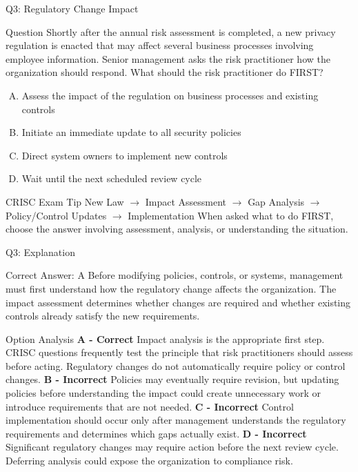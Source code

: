 \documentclass{beamer}
\begin{document}
	
	\begin{frame}{Q3: Regulatory Change Impact} \begin{block}{Question} Shortly after the annual risk assessment is completed, a new privacy regulation is enacted that may affect several business processes involving employee information. Senior management asks the risk practitioner how the organization should respond. What should the risk practitioner do FIRST? \end{block} \begin{enumerate}[(A)] \item Assess the impact of the regulation on business processes and existing controls \item Initiate an immediate update to all security policies \item Direct system owners to implement new controls \item Wait until the next scheduled review cycle \end{enumerate} \begin{block}{CRISC Exam Tip} New Law $\rightarrow$ Impact Assessment $\rightarrow$ Gap Analysis $\rightarrow$ Policy/Control Updates $\rightarrow$ Implementation When asked what to do FIRST, choose the answer involving assessment, analysis, or understanding the situation. \end{block} \end{frame} \begin{frame}{Q3: Explanation} \footnotesize \begin{block}{Correct Answer: A} Before modifying policies, controls, or systems, management must first understand how the regulatory change affects the organization. The impact assessment determines whether changes are required and whether existing controls already satisfy the new requirements. \end{block} \begin{block}{Option Analysis} \textbf{A - Correct} Impact analysis is the appropriate first step. CRISC questions frequently test the principle that risk practitioners should assess before acting. Regulatory changes do not automatically require policy or control changes. \vspace{0.15cm} \textbf{B - Incorrect} Policies may eventually require revision, but updating policies before understanding the impact could create unnecessary work or introduce requirements that are not needed. \vspace{0.15cm} \textbf{C - Incorrect} Control implementation should occur only after management understands the regulatory requirements and determines which gaps actually exist. \vspace{0.15cm} \textbf{D - Incorrect} Significant regulatory changes may require action before the next review cycle. Deferring analysis could expose the organization to compliance risk. \end{block}  \end{frame}
	
\end{document}
